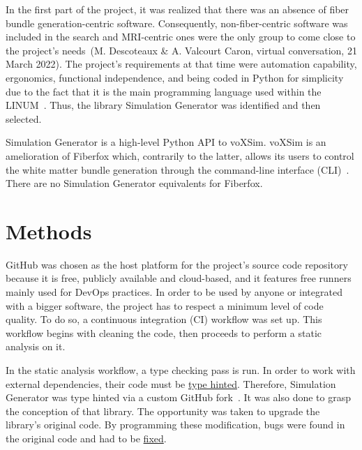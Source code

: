 \documentclass{article}
\begin{document}
  In the first part of the project, it was realized that there was an absence of fiber bundle generation-centric software.
  Consequently, non-fiber-centric software was included in the search and MRI-centric ones were the only group to come close to the project's needs~\nocite{descoteauxvalcourtcaron2022othertoolsthanfiberfox}(M. Descoteaux \& A. Valcourt Caron, virtual conversation, 21 March 2022).
  The project's requirements at that time were automation capability, ergonomics, functional independence, and being coded in Python for simplicity due to the fact that it is the main programming language used within the LINUM~\cite{dubreuil2022inf6200}.
  Thus, the library Simulation Generator was identified and then selected.

  Simulation Generator is a high-level Python API to voXSim.
  voXSim is an amelioration of Fiberfox which, contrarily to the latter, allows its users to control the white matter
  bundle generation through the command-line interface (CLI)~\cite{valcourtcaron2022simulationgenerator, neher2014fiberfox}.
  There are no Simulation Generator equivalents for Fiberfox.


  \section{Methods}\label{sec:methodology}

  GitHub was chosen as the host platform for the project's source code repository because it is free, publicly available and cloud-based, and it features free runners mainly used for DevOps practices.
  In order to be used by anyone or integrated with a bigger software, the project has to respect a minimum level of code quality.
  To do so, a continuous integration (CI) workflow was set up.
  This workflow begins with cleaning the code, then proceeds to perform a static analysis on it.

  In the static analysis workflow, a type checking pass is run.
  In order to work with external dependencies, their code must be \href{https://docs.python.org/3/library/typing.html}{type hinted}.
  Therefore, Simulation Generator was type hinted via a custom GitHub fork~\cite{dubreuil2022inm5803simgenfork, valcourtcaron2022simulationgenerator}.
  It was also done to grasp the conception of that library.
  The opportunity was taken to upgrade the library's original code.
  By programming these modification, bugs were found in the original code and had to be \href{https://github.com/benoit-dubreuil/voxsim/pulls?q=is\%3Apr+is\%3Aclosed}{fixed}.
\end{document}
